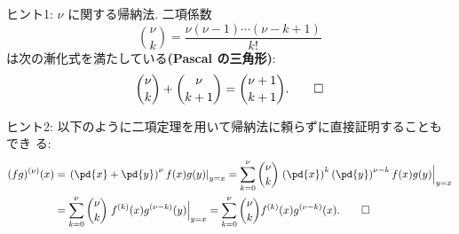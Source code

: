 \documentclass[12pt,twoside]{jarticle}
\begin{document}
\noindent
ヒント1: $\nu$ に関する帰納法.  二項係数
\begin{equation*}
  \binom{\nu}{k} = \frac{\nu(\nu-1)\cdots(\nu-k+1)}{k!}
\end{equation*}
は次の漸化式を満たしている{\bf (Pascal の三角形)}:
\begin{equation*}
  \binom{\nu}{k}+\binom{\nu}{k+1} = \binom{\nu+1}{k+1}.
\qed
\end{equation*}

\medskip
\noindent
ヒント2: 以下のように二項定理を用いて帰納法に頼らずに直接証明することもでき
る:
\begin{align*}
  (fg)^{(\nu)}(x) 
  &
  = \left.\left(\pd{x}+\pd{y}\right)^\nu f(x)g(y)\right|_{y=x}
  = \sum_{k=0}^\nu \binom{\nu}{k} 
    \left.\left(\pd{x}\right)^k \left(\pd{y}\right)^{\nu-k}
    f(x)g(y)\right|_{y=x}
  \\ &
  = \sum_{k=0}^\nu \binom{\nu}{k} \left.f^{(k)}(x)g^{(\nu-k)}(y)\right|_{y=x}
  = \sum_{k=0}^\nu \binom{\nu}{k} f^{(k)}(x)g^{(\nu-k)}(x).
\qed
\end{align*}

\end{document}
